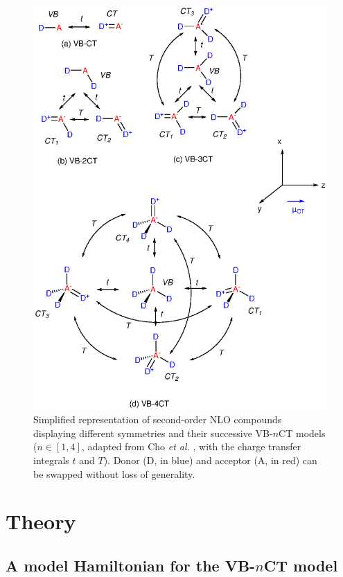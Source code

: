 \documentclass[USenglish]{article}
\begin{document}
\begin{figure}
	\includegraphics[width=.7\linewidth]{Figure2}
	\caption{Simplified representation of second-order NLO compounds displaying different symmetries and their successive VB-$n$CT models ($n\in[1,4]$, adapted from Cho \textit{et al.} \cite{choNonlinearOpticalProperties2002}, with the charge transfer integrals $t$ and $T$). Donor (D, in blue) and acceptor (A, in red) can be swapped without loss of generality.}
	\label{sc:mct}
\end{figure}


\clearpage
\section{Theory \label{sec:theory}}

\subsection{A model Hamiltonian for the VB-$n$CT model}
\end{document}
